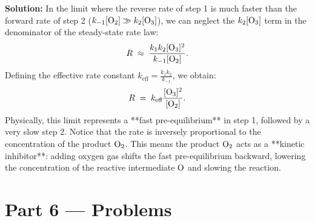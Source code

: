 \documentclass[12pt, a4paper]{book}
\begin{document}
\begin{problembox}
\begin{enumerate}[label=\textbf{E\arabic*.}]
        \textbf{Solution:}
        In the limit where the reverse rate of step 1 is much faster than the forward rate of step 2 ($k_{-1}[\ce{O2}] \gg k_2[\ce{O3}]$), we can neglect the $k_2[\ce{O3}]$ term in the denominator of the steady-state rate law:
        \[
          R \;\approx\; \frac{k_1 k_2 [\ce{O3}]^2}{k_{-1} [\ce{O2}]}.
        \]
        Defining the effective rate constant $k_{\text{eff}} = \frac{k_1 k_2}{k_{-1}}$, we obtain:
        \[
          R \;=\; k_{\text{eff}} \frac{[\ce{O3}]^2}{[\ce{O2}]}.
        \]
        Physically, this limit represents a **fast pre-equilibrium** in step 1, followed by a very slow step 2.
        Notice that the rate is inversely proportional to the concentration of the product $\ce{O2}$. This means the product $\ce{O2}$ acts as a **kinetic inhibitor**: adding oxygen gas shifts the fast pre-equilibrium backward, lowering the concentration of the reactive intermediate $\ce{O}$ and slowing the reaction.
\end{enumerate}
\end{problembox}

\newpage

\section{Part 6 --- Problems}
\end{document}
